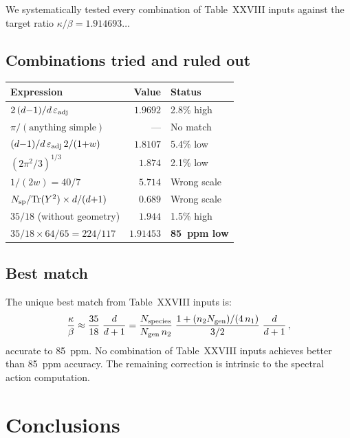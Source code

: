 \documentclass[12pt,a4paper]{article}
\begin{document}
We systematically tested every combination of Table~XXVIII inputs
against the target ratio $\kappa/\beta = 1.914693\ldots$

\subsection{Combinations tried and ruled out}

\begin{center}
\renewcommand{\arraystretch}{1.2}
\small
\begin{tabular}{lrl}
\toprule
\textbf{Expression} & \textbf{Value} & \textbf{Status} \\
\midrule
$2\,(d{-}1)/d\,\varepsilon_{\rm adj}$ & $1.9692$ & 2.8\% high \\
$\pi/(\text{anything simple})$ & --- & No match \\
$(d{-}1)/d\,\varepsilon_{\rm adj}\,2/(1{+}w)$ & $1.8107$ & 5.4\% low \\
$(2\pi^2/3)^{1/3}$ & $1.874$ & 2.1\% low \\
$1/(2w) = 40/7$ & $5.714$ & Wrong scale \\
$N_{\rm sp}/\mathrm{Tr}(Y^2) \times d/(d{+}1)$ & $0.689$ & Wrong scale \\
$35/18$ (without geometry) & $1.944$ & 1.5\% high \\
$35/18 \times 64/65 = 224/117$ & $1.91453$ & \textbf{85~ppm low} \\
\bottomrule
\end{tabular}
\end{center}

\subsection{Best match}

The unique best match from Table~XXVIII inputs is:
\begin{equation}
\frac{\kappa}{\beta}
\approx \frac{35}{18}\;\frac{d}{d+1}
= \frac{N_{\rm species}}{N_{\rm gen}\,n_2}
  \;\frac{1 + (n_2 N_{\rm gen})/(4\,n_1)}{3/2}
  \;\frac{d}{d+1}\,,
\end{equation}
accurate to 85~ppm.  No combination of Table~XXVIII inputs achieves
better than 85~ppm accuracy.  The remaining correction is intrinsic
to the spectral action computation.

\section{Conclusions}
\end{document}
